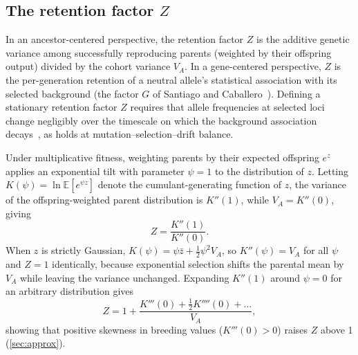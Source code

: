 \documentclass{article}
\begin{document}
\subsection{The retention factor \texorpdfstring{$Z$}{Z}}\label{app:B_Z}
In an ancestor-centered perspective, the retention factor $Z$ is the additive genetic variance among successfully reproducing parents (weighted by their offspring output) divided by the cohort variance $V_A$. In a gene-centered perspective, $Z$ is the per-generation retention of a neutral allele's statistical association with its selected background (the factor $G$ of Santiago and Caballero~\cite{santiago1995}). Defining a stationary retention factor $Z$ requires that allele frequencies at selected loci change negligibly over the timescale on which the background association decays~\cite{barton1998,barton2000}, as holds at mutation--selection--drift balance.

Under multiplicative fitness, weighting parents by their expected offspring $e^{z}$ applies an exponential tilt with parameter $\psi = 1$ to the distribution of $z$. Letting $K(\psi) = \ln \mathbb{E}[e^{\psi z}]$ denote the cumulant-generating function of $z$, the variance of the offspring-weighted parent distribution is $K''(1)$, while $V_A = K''(0)$, giving
\begin{equation}
    Z = \frac{K''(1)}{K''(0)}. \label{eq:Zcgf}
\end{equation}
When $z$ is strictly Gaussian, $K(\psi) = \psi\bar{z} + \tfrac12\psi^2V_A$, so $K''(\psi) = V_A$ for all $\psi$ and $Z = 1$ identically, because exponential selection shifts the parental mean by $V_A$ while leaving the variance unchanged. Expanding $K''(1)$ around $\psi = 0$ for an arbitrary distribution gives
\begin{equation}
    Z = 1 + \frac{K'''(0) + \tfrac12 K''''(0) + \dots}{V_A},
\end{equation}
showing that positive skewness in breeding values ($K'''(0) > 0$) raises $Z$ above 1 (\autoref{sec:approx}).
\end{document}
